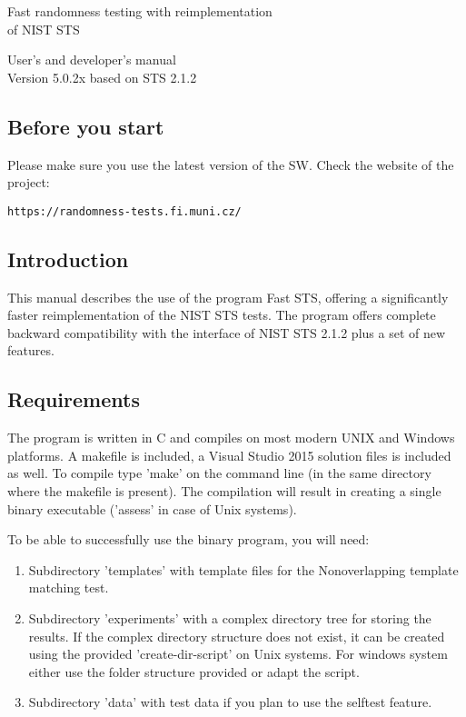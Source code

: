 \documentclass[12pt]{article}
\begin{document}
\thispagestyle{empty}

\begin{center}
\vspace*{65mm}
{\LARGE\textsf{
               Fast randomness testing with reimplementation\\[6pt]
                              of NIST STS}}
\par\vspace{50mm}
{\Large\textsf{
	             User's and developer's manual\\[2mm]
                     Version 5.0.2x based on STS 2.1.2}}
\end{center}

\vspace{50mm}
{\Large{}}

\newpage
\subsection*{Before you start}
Please make sure you use the latest version of the SW. Check the website of the project:

\medskip
\hfil\verb|https://randomness-tests.fi.muni.cz/|

\subsection*{Introduction}
This manual describes the use of the program Fast STS, offering a significantly faster reimplementation of the NIST STS tests. The program offers complete backward compatibility with the interface of NIST STS 2.1.2 plus a set of new features.

\subsection*{Requirements}
The program is written in C and compiles on most modern UNIX and Windows platforms. A makefile is included, a Visual Studio 2015 solution files is included as well. To compile type 'make' on the command line (in the same directory where the makefile is present). The compilation will result in creating a single binary executable ('assess' in case of Unix systems).

\medskip
To be able to successfully use the binary program, you will need:

\begin{enumerate}
\setlength\itemsep{-3pt}
\item  Subdirectory 'templates' with template files for the Nonoverlapping template\\ matching test.
\item  Subdirectory 'experiments' with a complex directory tree for storing the results. If the complex directory structure does not exist, it can be created using the provided 'create-dir-script' on Unix systems. For windows system either use the folder structure provided or adapt the script.
\item  Subdirectory 'data' with test data if you plan to use the selftest feature.
\end{enumerate}
\end{document}
